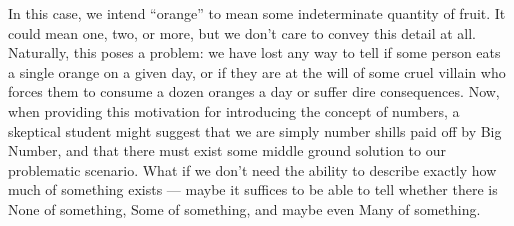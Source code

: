 In this case, we intend ``orange'' to mean some indeterminate quantity of fruit.
It could mean one, two, or more, but we don't care to convey this detail at all.
Naturally, this poses a problem: we have lost any way to tell if some person eats
a single orange on a given day, or if they are at the will of some cruel villain
who forces them to consume a dozen oranges a day or suffer dire consequences.
Now, when providing this motivation for introducing the concept of numbers, a
skeptical student might suggest that we are simply number shills paid off by Big
Number, and that there must exist some middle ground solution to our problematic
scenario.
What if we don't need the ability to describe exactly how much of something
exists --- maybe it suffices to be able to tell whether there is None of
something, Some of something, and maybe even Many of something.

